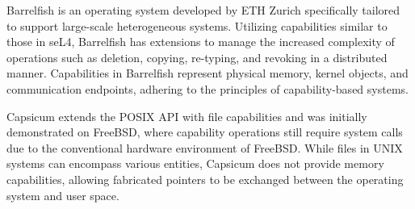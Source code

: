 


Barrelfish is an operating system developed by ETH Zurich specifically tailored to support large-scale heterogeneous systems. Utilizing capabilities 
similar to those in seL4, Barrelfish has extensions to manage the increased complexity of operations such as deletion, copying, re-typing, 
and revoking in a distributed manner. Capabilities in Barrelfish represent physical memory, kernel objects, and communication 
endpoints, adhering to the principles of capability-based systems.

Capsicum extends the POSIX API with file capabilities and was initially demonstrated on FreeBSD, where capability operations still require 
system calls due to the conventional hardware environment of FreeBSD. While files in UNIX systems can encompass various entities, 
Capsicum does not provide memory capabilities, allowing fabricated pointers to be exchanged between the operating system and user space.

